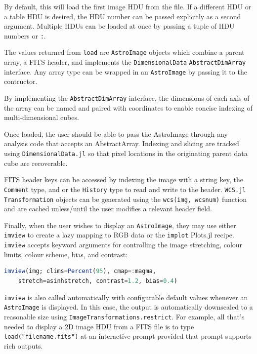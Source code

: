 \documentclass{juliacon}
\begin{document}
By default, this will load the first image HDU from the file. If a different HDU or a table HDU is desired, the HDU number can be passed explicitly as a second argument.
Multiple HDUs can be loaded at once by passing a tuple of HDU numbers or \verb|:|. 

The values returned from \verb|load| are \verb|AstroImage| objects which combine a parent array, a FITS header, and implements the \verb|DimensionalData| \verb|AbstractDimArray| interface.
Any array type can be wrapped in an \verb|AstroImage| by passing it to the contructor.

By implementing the \verb|AbstractDimArray| interface, the dimensions of each axis of the array can be named and paired with coordinates to enable concise indexing of multi-dimensional cubes.

Once loaded, the user should be able to pass the AstroImage through any analysis code that accepts an AbstractArray. Indexing and slicing are tracked using \verb|DimensionalData.jl| so that pixel locations in the originating parent data cube are recoverable.

FITS header keys can be accessed by indexing the image with a string key, the \verb|Comment| type, and or the \verb|History| type to read and write to the header. \verb|WCS.jl| \verb|Transformation| objects can be generated using the \verb|wcs(img, wcsnum)| function and are cached unless/until the user modifies a relevant header field.

Finally, when the user wishes to display an \verb|AstroImage|, they may use either 
\verb|imview| to create a lazy mapping to RGB data or the \verb|implot| Plots.jl recipe. 
\verb|imview| accepts keyword arguments for controlling the image stretching, colour limits, colour scheme, bias, and contrast:

\begin{lstlisting}[language = Julia]
imview(img; clims=Percent(95), cmap=:magma,
    stretch=asinhstretch, contrast=1.2, bias=0.4)
\end{lstlisting}

\verb|imview| is also called automatically with configurable default values whenever an \verb|AstroImage| is displayed.
In this case, the output is automatically downscaled to a reasonable size using \verb|ImageTransformations.restrict|.
For example, all that's needed to display a 2D image HDU from a FITS file is to type \verb|load("filename.fits")| at an interactive prompt provided that prompt supports rich outputs.
\end{document}
